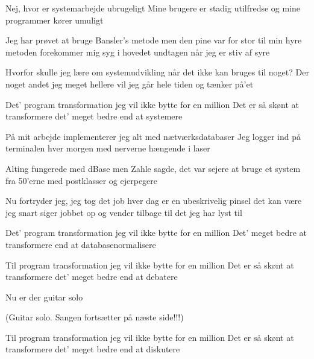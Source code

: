 \documentclass[10pt]{article}
\begin{document}
\begin{song}

 Nej, hvor er systemarbejde 
\qquad ubrugeligt
Mine brugere er stadig utilfredse
og mine programmer kører umuligt

Jeg har prøvet at bruge Bansler's metode
men den pine var for stor til min hyre
metoden forekommer mig syg i hovedet
undtagen når jeg er stiv af syre

Hvorfor skulle jeg lære om systemudvikling 
når det ikke kan bruges til noget?
Der noget andet jeg meget hellere vil
jeg går hele tiden og tænker på'et

 Det' program transformation
jeg vil ikke bytte for en million
Det er så skønt at transformere
det' meget bedre end at systemere\pagebreak[3]

 På mit arbejde implementerer jeg alt
med nætværksdatabaser
Jeg logger ind på terminalen hver morgen
med nerverne hængende i laser

Alting fungerede med dBase 
men Zahle sagde, det var sejere
at bruge et system fra 50'erne
med postklasser og ejerpegere

Nu fortryder jeg, jeg tog det job
hver dag er en ubeskrivelig pinsel
det kan være jeg snart siger jobbet op
og vender tilbage til det jeg har lyst til

 Det' program transformation
jeg vil ikke bytte for en million
Det' meget bedre at transformere
end at databasenormalisere\pagebreak[4]



 Til program transformation
jeg vil ikke bytte for en million
Det er så skønt at transformere
det' meget bedre end at debatere

Nu er der guitar solo

\strut\scene (Guitar solo. Sangen fortsætter på næste side!!!)

 Til program transformation
jeg vil ikke bytte for en million
Det er så skønt at transformere
det' meget bedre end at diskutere


\end{song}
\end{document}
